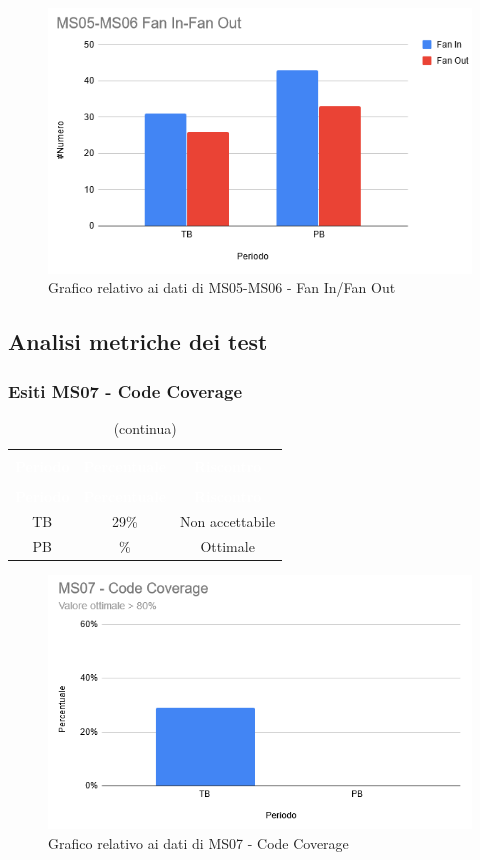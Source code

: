 \begin{figure}[H]
\centering
\includegraphics[scale=0.7]{./img/MS05-MS06.png}
\caption{Grafico relativo ai dati di MS05-MS06 - Fan In/Fan Out}
\end{figure}


\subsection{Analisi metriche dei test}
\subsubsection{Esiti MS07 - Code Coverage}
\begin{longtable}{c c c}
\rowcolor{white}\caption{Esiti MS07 - Code Coverage} \\
	\rowcolor{redafk}
\textcolor{white}{\textbf{Periodo}} & 
\textcolor{white}{\textbf{Percentuale}} & 
\textcolor{white}{\textbf{Riscontro}} \\
	\endfirsthead
		\rowcolor{white}\caption[]{(continua)} \\
		\rowcolor{redafk}
\textcolor{white}{\textbf{Periodo}} & 
\textcolor{white}{\textbf{Percentuale}} & 
\textcolor{white}{\textbf{Riscontro}} \\
	\endhead
	TB & 29\% & Non accettabile\\
	PB & \% & Ottimale\\
\end{longtable}

\begin{figure}[H]
\centering
\includegraphics[scale=0.7]{./img/MS07.png}
\caption{Grafico relativo ai dati di MS07 - Code Coverage}
\end{figure}

